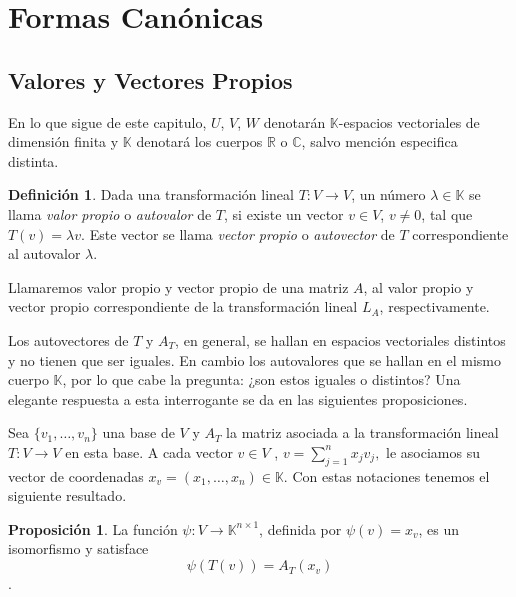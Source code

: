 \documentclass[10pt,a4paper]{article}
\theoremstyle{definition}
\newtheorem{definition}{Definición}[section]
\newtheorem{proposition}{Proposición}[section]
\begin{document}
\section{Formas Canónicas}

\subsection{Valores y Vectores Propios}

En lo que sigue de este capitulo, $U$, $V$, $W$ denotarán $\mathbb{K}$-espacios vectoriales de dimensión finita y $\mathbb{K}$ denotará los cuerpos $\mathbb{R}$ o $\mathbb{C}$, salvo mención especifica distinta.

\begin{definition}
Dada una transformación lineal $T\colon V \rightarrow{V}$, un número $\lambda\in\mathbb{K}$ se llama \emph{valor propio} o \emph{autovalor} de $T$, si existe un vector $v\in V$, $v\neq0$, tal que $T(v)=\lambda v$. Este vector se llama \emph{vector propio} o \emph{autovector} de $T$ correspondiente al autovalor $\lambda$.

Llamaremos valor propio y vector propio de una matriz $A$, al valor propio y vector propio correspondiente de la transformación lineal $L_{A}$, respectivamente.
\end{definition}

Los autovectores de $T$ y $A_{T}$, en general, se hallan en espacios vectoriales distintos y no tienen que ser iguales. En cambio los autovalores que se hallan en el mismo cuerpo $\mathbb{K}$, por lo que cabe la pregunta: ¿son estos iguales o distintos? Una elegante respuesta a esta interrogante se da en las siguientes proposiciones.

Sea $\{v_1,\ldots,v_n\}$ una base de $V$ y $A_{T}$ la matriz asociada a la transformación lineal $T\colon V \rightarrow{V}$ en esta base. A cada vector $v\in V$ , $v = \sum\limits_{j=1}^{n}x_{j}v_{j},$ le asociamos su vector de coordenadas $x_v=(x_1,\ldots,x_n)\in\mathbb{K}$. Con estas notaciones tenemos el siguiente resultado.

\begin{proposition}
La función $\psi\colon V\rightarrow\mathbb{K}^{n\times 1}$, definida por $\psi(v)= x_v$, es un isomorfismo y satisface \[ \psi(T(v))=A_{T}(x_v) \].    
\end{proposition}
\end{document}
